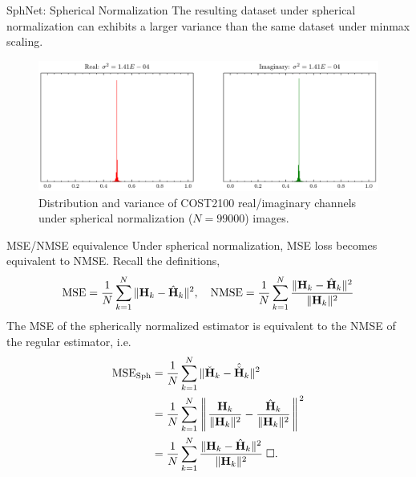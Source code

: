 \documentclass{beamer}
\begin{document}
  \begin{frame}{SphNet: Spherical Normalization}
    The resulting dataset under spherical normalization can exhibits a larger variance than the same dataset under minmax scaling. 
    \begin{figure}[htb]
      \centering
      \includegraphics[width=.9\textwidth]{cost2100_indoor_sph_dist.pdf}
      \caption{Distribution and variance of COST2100 real/imaginary channels under spherical normalization ($N=99000$) images.}
      \label{fig:cost_indoor_sph_dist}
    \end{figure}
  \end{frame}

  \begin{frame}{MSE/NMSE equivalence}
    \footnotesize{
    Under spherical normalization, MSE loss becomes equivalent to NMSE. Recall the definitions,
    \begin{align*} 
      \text{MSE}=\frac 1N \sum_{k=1}^N\Arrowvert\mathbf H_k - \hat{\mathbf H}_k\Arrowvert^2,\quad \text{NMSE} =\frac 1N \sum_{k=1}^N\frac{\Arrowvert\mathbf H_k - \hat{\mathbf H}_k\Arrowvert^2}{\Arrowvert\mathbf H_k\Arrowvert^2} \\        
    \end{align*}
    The MSE of the spherically normalized estimator is equivalent to the NMSE of the regular estimator, i.e.
    \begin{align*}
      \text{MSE}_{\text{Sph}} &= \frac 1N \sum_{k=1}^N\Arrowvert\check{\mathbf H}_k - \hat{\check{\mathbf H}}_k\Arrowvert^2 \\
      &= \frac 1N \sum_{k=1}^N\left\Arrowvert \frac{\mathbf H_k}{\Arrowvert\mathbf H_k\Arrowvert^2} - \frac{\hat{\mathbf H}_k}{\Arrowvert\mathbf H_k\Arrowvert^2}\right\Arrowvert^2 \\
      &= \frac 1N \sum_{k=1}^N\frac{\Arrowvert\mathbf H_k - \hat{\mathbf H}_k\Arrowvert^2}{\Arrowvert\mathbf H_k\Arrowvert^2} \; \Box.
    \end{align*}
    }
\end{frame}
\end{document}
